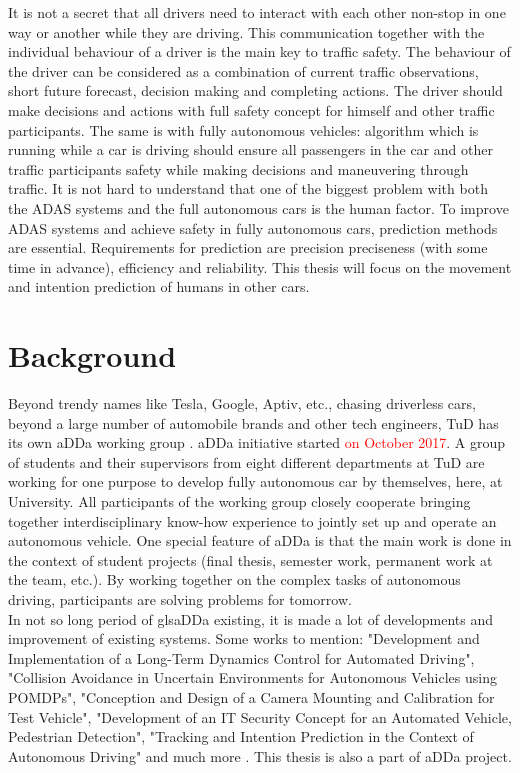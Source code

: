 It is not a secret that all drivers need to interact with each other non-stop in one way or another while they are driving. This communication together with the individual behaviour of a driver is the main key to traffic safety. The behaviour of the driver can be considered as a combination of current traffic observations, short future forecast, decision making and completing actions. The driver should make decisions and actions with full safety concept for himself and other traffic participants. The same is with fully autonomous vehicles: algorithm which is running while a car is driving should ensure all passengers in the car and other traffic participants safety while making decisions and maneuvering through traffic. It is not hard to understand that one of the biggest problem with both the \gls{ADAS} systems and the full autonomous cars is the human factor. To improve \gls{ADAS} systems and achieve safety in fully autonomous cars, prediction methods are essential. Requirements for prediction are precision preciseness (with some time in advance), efficiency and reliability. This thesis will focus on the movement and intention prediction of humans in other cars.

\section{Background}

Beyond trendy names like Tesla, Google, Aptiv, etc., chasing driverless cars, beyond a large number of automobile brands and other tech engineers, \gls{TuD} has its own \gls{aDDa} working group \cite{aDDa}. \gls{aDDa} initiative started \textcolor{red}{on October 2017}. A group of students and their supervisors from eight different departments at \gls{TuD} are working for one purpose to develop fully autonomous car by themselves, here, at University. All participants of the working group closely cooperate bringing together interdisciplinary know-how experience to jointly set up and operate an autonomous vehicle. One special feature of \gls{aDDa} is that the main work is done in the context of student projects (final thesis, semester work, permanent work at the team, etc.). By working together on the complex tasks of autonomous driving, participants are solving problems for tomorrow. \\

In not so long period of gls{aDDa} existing, it is made a lot of developments and improvement of existing systems. Some works to mention: "Development and Implementation of a Long-Term Dynamics Control for Automated Driving", "Collision Avoidance in Uncertain Environments for Autonomous Vehicles using POMDPs", "Conception and Design of a Camera Mounting and Calibration for Test Vehicle", "Development of an IT Security Concept for an Automated Vehicle, Pedestrian Detection", "Tracking and Intention Prediction in the Context of Autonomous Driving" and much more \textcolor{red}{\cite{aDDa}}. This thesis is also a part of \gls{aDDa} project.

